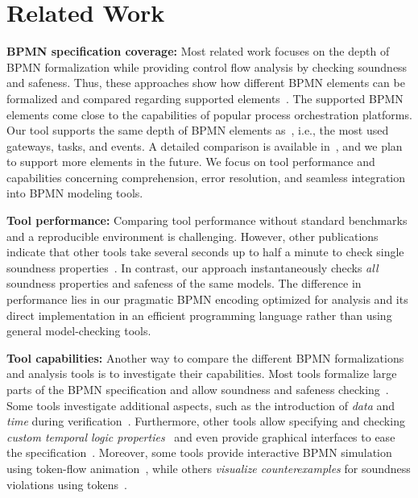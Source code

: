 \documentclass[
onecolumn, %
]{ceurart}
\begin{document}
\section{Related Work} \label{sec:related-work}

\textbf{BPMN specification coverage:}
Most related work focuses on the depth of BPMN formalization while providing control flow analysis by checking soundness and safeness.
Thus, these approaches show how different BPMN elements can be formalized and compared regarding supported elements~\cite{krauterHigherorderTransformationApproach2024,corradiniFormalApproachAnalysis2021,houhouFirstOrderLogicVerification2022}.
The supported BPMN elements come close to the capabilities of popular process orchestration platforms.
Our tool supports the same depth of BPMN elements as~\cite{corradiniFormalApproachAnalysis2021}, i.e., the most used gateways, tasks, and events.
A detailed comparison is available in~\cite{krauterInstantaneousComprehensibleFixable2024}, and we plan to support more elements in the future.
We focus on tool performance and capabilities concerning comprehension, error resolution, and seamless integration into BPMN modeling tools.

\textbf{Tool performance:}
Comparing tool performance without standard benchmarks and a reproducible environment is challenging.
However, other publications indicate that other tools take several seconds up to half a minute to check single soundness properties~\cite{krauterHigherorderTransformationApproach2024,corradiniFormalApproachAnalysis2021,houhouFirstOrderLogicVerification2022}.
In contrast, our approach instantaneously checks \textit{all} soundness properties and safeness of the same models.
The difference in performance lies in our pragmatic BPMN encoding optimized for analysis and its direct implementation in an efficient programming language rather than using general model-checking tools.

\textbf{Tool capabilities:}
Another way to compare the different BPMN formalizations and analysis tools is to investigate their capabilities.
Most tools formalize large parts of the BPMN specification and allow soundness and safeness checking~\cite{krauterHigherorderTransformationApproach2024,corradiniFormalApproachAnalysis2021,houhouFirstOrderLogicVerification2022}.
Some tools investigate additional aspects, such as the introduction of \textit{data} and \textit{time} during verification~\cite{houhouFirstOrderLogicVerification2022,corradiniFormalisingAnimatingMultiple2022}.
Furthermore, other tools allow specifying and checking \textit{custom temporal logic properties}~\cite{krauterHigherorderTransformationApproach2024,corradiniFormalApproachAnalysis2021} and even provide graphical interfaces to ease the specification~\cite{krauterHigherorderTransformationApproach2024}.
Moreover, some tools provide interactive BPMN simulation using token-flow animation~\cite{corradiniFormalisingAnimatingMultiple2022}, while others \textit{visualize counterexamples} for soundness violations using tokens~\cite{houhouFirstOrderLogicVerification2022}.
\end{document}
